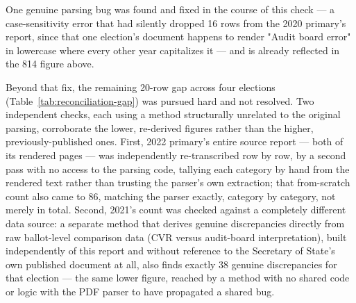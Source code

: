 \begin{table}[t]\centering
{}
\caption{Reconciliation of the independently re-derived discrepancy-report row counts against an earlier published tally of the same eight elections. \label{tab:reconciliation-gap}}
\end{table}

One genuine parsing bug was found and fixed in the course of this check —
a case-sensitivity error that had silently dropped 16 rows from the 2020
primary's report, since that one election's document happens to render
"Audit board error" in lowercase where every other year capitalizes
it — and is already reflected in the 814 figure above.

Beyond that fix, the remaining 20-row gap across four elections
(Table~\ref{tab:reconciliation-gap}) was pursued hard and not resolved.
Two independent checks, each using a method structurally unrelated to
the original parsing, corroborate the lower, re-derived figures rather
than the higher, previously-published ones. First, 2022 primary's entire
source report — both of its rendered pages — was independently
re-transcribed row by row, by a second pass with no access to the
parsing code, tallying each category by hand from the rendered text
rather than trusting the parser's own extraction; that from-scratch count
also came to 86, matching the parser exactly, category by category, not
merely in total. Second, 2021's count was checked against a completely
different data source: a separate method that derives genuine
discrepancies directly from raw ballot-level comparison data (CVR versus
audit-board interpretation), built independently of this report and
without reference to the Secretary of State's own published document at
all, also finds exactly 38 genuine discrepancies for that election — the
same lower figure, reached by a method with no shared code or logic with
the PDF parser to have propagated a shared bug.

